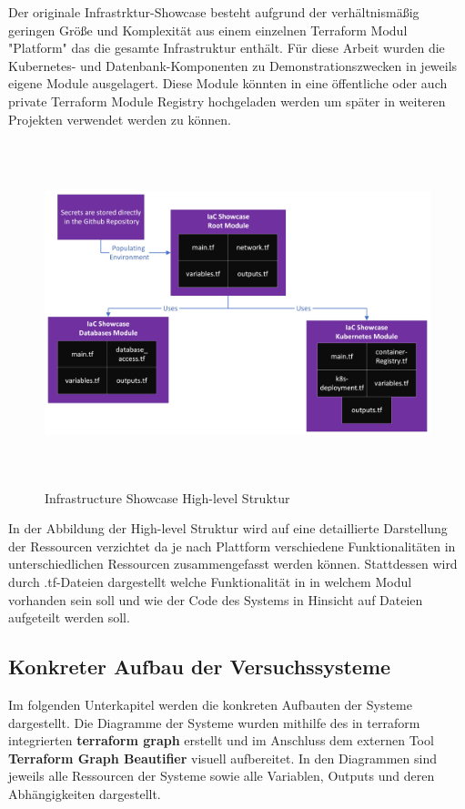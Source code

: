 Der originale Infrastrktur-Showcase besteht aufgrund der verhältnismäßig
geringen Größe und Komplexität aus einem einzelnen Terraform Modul
"Platform" das die gesamte Infrastruktur enthält. Für diese Arbeit wurden
die Kubernetes- und Datenbank-Komponenten zu Demonstrationszwecken in
jeweils eigene Module ausgelagert. Diese Module könnten in
eine öffentliche oder auch private Terraform Module Registry
hochgeladen werden um später in weiteren Projekten verwendet werden zu
können.

\begin{figure}[H]
  \includegraphics[keepaspectratio, height=10cm]{fig/hauptteil/IaC_Showcase_Structure_High-level.png}
  \caption{Infrastructure Showcase High-level Struktur}
  \centering
\end{figure}

In der Abbildung der High-level Struktur wird auf eine detaillierte
Darstellung der Ressourcen verzichtet da je nach Plattform verschiedene
Funktionalitäten in unterschiedlichen Ressourcen zusammengefasst werden
können. Stattdessen wird durch .tf-Dateien dargestellt welche
Funktionalität in in welchem Modul vorhanden sein soll und wie der Code
des Systems in Hinsicht auf Dateien aufgeteilt werden soll.

\subsection{Konkreter Aufbau der Versuchssysteme}

Im folgenden Unterkapitel werden die konkreten Aufbauten der Systeme
dargestellt. Die Diagramme der Systeme wurden mithilfe des in
terraform integrierten \textbf{terraform graph} erstellt und im
Anschluss dem externen Tool \textbf{Terraform Graph Beautifier}
visuell aufbereitet. In den Diagrammen sind jeweils alle Ressourcen
der Systeme sowie alle Variablen, Outputs und deren Abhängigkeiten
dargestellt.

